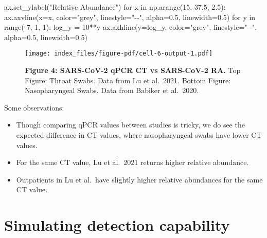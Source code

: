 \documentclass[
  letterpaper,
  DIV=11,
  numbers=noendperiod]{scrartcl}
\newenvironment{Shaded}{\begin{snugshade}}{\end{snugshade}}
\newcommand{\BuiltInTok}[1]{\textcolor[rgb]{0.00,0.23,0.31}{#1}}
\newcommand{\ControlFlowTok}[1]{\textcolor[rgb]{0.00,0.23,0.31}{#1}}
\newcommand{\DecValTok}[1]{\textcolor[rgb]{0.68,0.00,0.00}{#1}}
\newcommand{\FloatTok}[1]{\textcolor[rgb]{0.68,0.00,0.00}{#1}}
\newcommand{\KeywordTok}[1]{\textcolor[rgb]{0.00,0.23,0.31}{#1}}
\newcommand{\NormalTok}[1]{\textcolor[rgb]{0.00,0.23,0.31}{#1}}
\newcommand{\OperatorTok}[1]{\textcolor[rgb]{0.37,0.37,0.37}{#1}}
\newcommand{\StringTok}[1]{\textcolor[rgb]{0.13,0.47,0.30}{#1}}
\providecommand{\tightlist}{%
  \setlength{\itemsep}{0pt}\setlength{\parskip}{0pt}}\usepackage{longtable,booktabs,array}
\begin{document}
\begin{Shaded}
\begin{Highlighting}[]
\NormalTok{    ax.set\_ylabel(}\StringTok{"Relative Abundance"}\NormalTok{)}
    \ControlFlowTok{for}\NormalTok{ x }\KeywordTok{in}\NormalTok{ np.arange(}\DecValTok{15}\NormalTok{, }\FloatTok{37.5}\NormalTok{, }\FloatTok{2.5}\NormalTok{):}
\NormalTok{        ax.axvline(x}\OperatorTok{=}\NormalTok{x, color}\OperatorTok{=}\StringTok{"grey"}\NormalTok{, linestyle}\OperatorTok{=}\StringTok{"{-}{-}"}\NormalTok{, alpha}\OperatorTok{=}\FloatTok{0.5}\NormalTok{, linewidth}\OperatorTok{=}\FloatTok{0.5}\NormalTok{)}
    \ControlFlowTok{for}\NormalTok{ y }\KeywordTok{in} \BuiltInTok{range}\NormalTok{(}\OperatorTok{{-}}\DecValTok{7}\NormalTok{, }\DecValTok{1}\NormalTok{, }\DecValTok{1}\NormalTok{):}
\NormalTok{        log\_y }\OperatorTok{=} \DecValTok{10}\OperatorTok{**}\NormalTok{y}
\NormalTok{        ax.axhline(y}\OperatorTok{=}\NormalTok{log\_y, color}\OperatorTok{=}\StringTok{"grey"}\NormalTok{, linestyle}\OperatorTok{=}\StringTok{"{-}{-}"}\NormalTok{, alpha}\OperatorTok{=}\FloatTok{0.5}\NormalTok{, linewidth}\OperatorTok{=}\FloatTok{0.5}\NormalTok{)}
\end{Highlighting}
\end{Shaded}

\begin{figure}[H]

{\centering \texttt{[image: index\_files/figure-pdf/cell-6-output-1.pdf]}

}

\caption{\textbf{Figure 4: SARS-CoV-2 qPCR CT vs SARS-CoV-2 RA.} Top
Figure: Throat Swabs. Data from Lu et al.~2021. Bottom Figure:
Nasopharyngeal Swabs. Data from Babiker et al.~2020.}

\end{figure}%

Some observations:

\begin{itemize}
\tightlist
\item
  Though comparing qPCR values between studies is tricky, we do see the
  expected difference in CT values, where nasopharyngeal swabs have
  lower CT values.
\item
  For the same CT value, Lu et al.~2021 returns higher relative
  abundance.
\item
  Outpatients in Lu et al.~have slightly higher relative abundances for
  the same CT value.
\end{itemize}

\section{Simulating detection
capability}\label{simulating-detection-capability}
\end{document}
